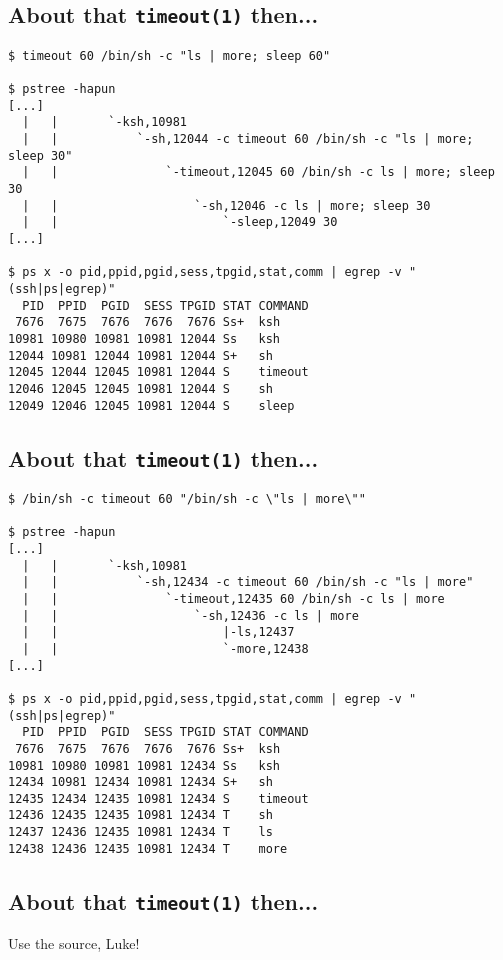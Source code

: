 \documentclass[xga]{xdvislides}
\newcommand{\smallish}{\fontsize{18}{18}\selectfont}
\begin{document}
\subsection{About that {\tt timeout(1)} then...}
\smallish
\begin{verbatim}
$ timeout 60 /bin/sh -c "ls | more; sleep 60"

$ pstree -hapun
[...]
  |   |       `-ksh,10981
  |   |           `-sh,12044 -c timeout 60 /bin/sh -c "ls | more; sleep 30"
  |   |               `-timeout,12045 60 /bin/sh -c ls | more; sleep 30
  |   |                   `-sh,12046 -c ls | more; sleep 30
  |   |                       `-sleep,12049 30
[...]

$ ps x -o pid,ppid,pgid,sess,tpgid,stat,comm | egrep -v "(ssh|ps|egrep)"
  PID  PPID  PGID  SESS TPGID STAT COMMAND
 7676  7675  7676  7676  7676 Ss+  ksh
10981 10980 10981 10981 12044 Ss   ksh
12044 10981 12044 10981 12044 S+   sh
12045 12044 12045 10981 12044 S    timeout
12046 12045 12045 10981 12044 S    sh
12049 12046 12045 10981 12044 S    sleep
\end{verbatim}

\subsection{About that {\tt timeout(1)} then...}
\smallish
\begin{verbatim}
$ /bin/sh -c timeout 60 "/bin/sh -c \"ls | more\""

$ pstree -hapun
[...]
  |   |       `-ksh,10981
  |   |           `-sh,12434 -c timeout 60 /bin/sh -c "ls | more"
  |   |               `-timeout,12435 60 /bin/sh -c ls | more
  |   |                   `-sh,12436 -c ls | more
  |   |                       |-ls,12437
  |   |                       `-more,12438
[...]

$ ps x -o pid,ppid,pgid,sess,tpgid,stat,comm | egrep -v "(ssh|ps|egrep)"
  PID  PPID  PGID  SESS TPGID STAT COMMAND
 7676  7675  7676  7676  7676 Ss+  ksh
10981 10980 10981 10981 12434 Ss   ksh
12434 10981 12434 10981 12434 S+   sh
12435 12434 12435 10981 12434 S    timeout
12436 12435 12435 10981 12434 T    sh
12437 12436 12435 10981 12434 T    ls
12438 12436 12435 10981 12434 T    more
\end{verbatim}

\subsection{About that {\tt timeout(1)} then...}
Use the source, Luke!
\\
\end{document}
